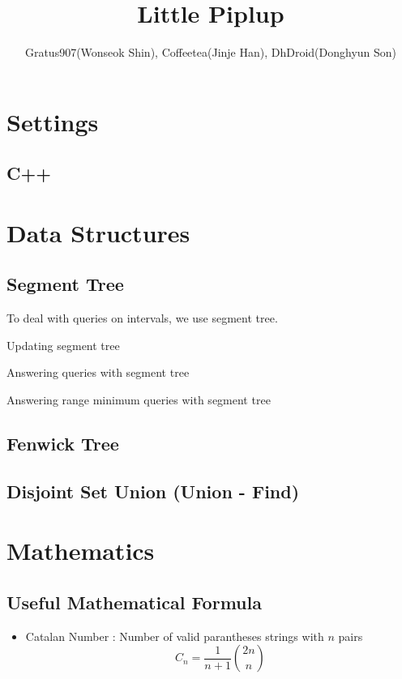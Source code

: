 \documentclass[landscape,8pt]{article}
\title{\Huge{\textsf{Little Piplup}}}
\author{Gratus907(Wonseok Shin), Coffeetea(Jinje Han), DhDroid(Donghyun Son)}
\date{ }
\begin{document}
\maketitle
\begin{multicols}{3}\raggedcolumns
\tableofcontents
\end{multicols}
\pagebreak
\begin{multicols}{2}\raggedcolumns


\section{Settings}

  \subsection{C++}

\section{Data Structures}
  \subsection{Segment Tree}
     To deal with queries on intervals, we use segment tree.
     
     Updating segment tree
     
     Answering queries with segment tree
     
     Answering range minimum queries with segment tree
  \subsection{Fenwick Tree}
  \subsection{Disjoint Set Union (Union - Find)}
      

\columnbreak
\section{Mathematics}
  \subsection{Useful Mathematical Formula}
    \begin{itemize}
      \item Catalan Number : Number of valid parantheses strings with $n$ pairs
      \[
        C_n = \frac{1}{n+1}\binom{2n}{n}
      \]
    \end{itemize}

\end{multicols}
\end{document}
